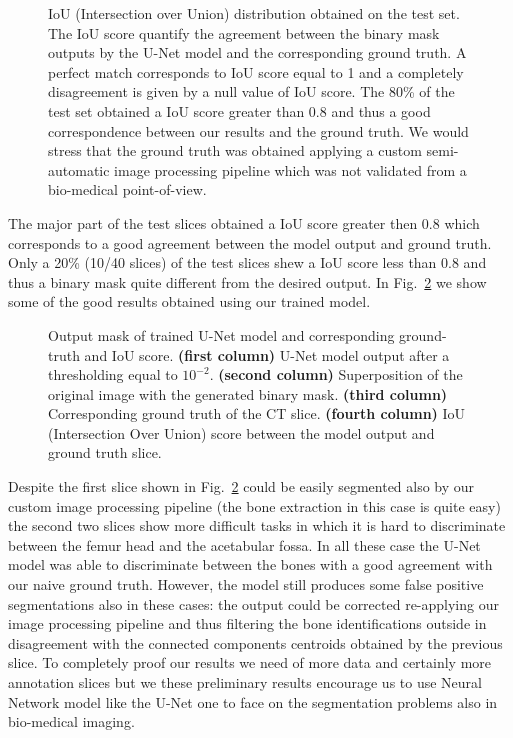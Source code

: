 \documentclass{standalone}
\begin{document}
\begin{figure}[htbp]
\centering
\def\svgwidth{0.85\textwidth}

\caption{IoU (Intersection over Union) distribution obtained on the test set.
The IoU score quantify the agreement between the binary mask outputs by the U-Net model and the corresponding ground truth.
A perfect match corresponds to IoU score equal to 1 and a completely disagreement is given by a null value of IoU score.
The 80\% of the test set obtained a IoU score greater than 0.8 and thus a good correspondence between our results and the ground truth.
We would stress that the ground truth was obtained applying a custom semi-automatic image processing pipeline which was not validated from a bio-medical point-of-view.
}
\label{fig:seg_iou}
\end{figure}

The major part of the test slices obtained a IoU score greater then 0.8 which corresponds to a good agreement between the model output and ground truth.
Only a 20\% (10/40 slices) of the test slices shew a IoU score less than 0.8 and thus a binary mask quite different from the desired output.
In Fig.~\ref{fig:seg_res} we show some of the good results obtained using our trained model.

\begin{figure}[htbp]
\centering
\def\svgwidth{\textwidth}

\caption{Output mask of trained U-Net model and corresponding ground-truth and IoU score.
\textbf{(first column)} U-Net model output after a thresholding equal to $10^{-2}$.
\textbf{(second column)} Superposition of the original image with the generated binary mask.
\textbf{(third column)} Corresponding ground truth of the CT slice.
\textbf{(fourth column)} IoU (Intersection Over Union) score between the model output and ground truth slice.
}
\label{fig:seg_res}
\end{figure}

Despite the first slice shown in Fig.~\ref{fig:seg_res} could be easily segmented also by our custom image processing pipeline (the bone extraction in this case is quite easy) the second two slices show more difficult tasks in which it is hard to discriminate between the femur head and the acetabular fossa.
In all these case the U-Net model was able to discriminate between the bones with a good agreement with our naive ground truth.
However, the model still produces some false positive segmentations also in these cases: the output could be corrected re-applying our image processing pipeline and thus filtering the bone identifications outside in disagreement with the connected components centroids obtained by the previous slice.
To completely proof our results we need of more data and certainly more annotation slices but we these preliminary results encourage us to use Neural Network model like the U-Net one to face on the segmentation problems also in bio-medical imaging.
\end{document}
